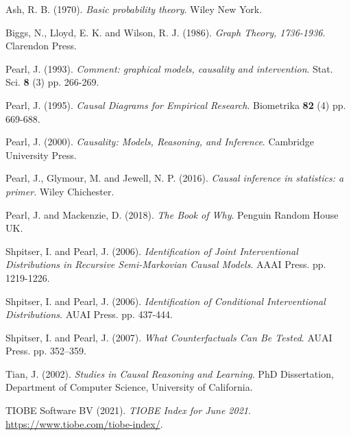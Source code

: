


\begin{thebibliography}{TIOBE 2021}%


 {\sc Ash, R. B.} (1970). {\em Basic probability theory}. Wiley New York.

 {\sc Biggs, N., Lloyd, E. K. and Wilson, R. J.} (1986). {\em Graph Theory, 1736-1936}. Clarendon Press.

 {\sc Pearl, J.} (1993). {\em Comment: graphical models, causality and intervention}. Stat. Sci. {\bf 8} (3) pp. 266-269.

 {\sc Pearl, J.} (1995). {\em Causal Diagrams for Empirical Research}. Biometrika {\bf 82} (4) pp. 669-688.

 {\sc Pearl, J.} (2000). {\em Causality: Models, Reasoning, and Inference}. Cambridge University Press.

 {\sc Pearl, J., Glymour, M. and Jewell, N. P.} (2016). {\em Causal inference in statistics: a primer}. Wiley Chichester.

 {\sc Pearl, J. and Mackenzie, D.} (2018). {\em The Book of Why}. Penguin Random House UK.

 {\sc Shpitser, I. and Pearl, J.} (2006). {\em Identification of Joint Interventional Distributions in Recursive Semi-Markovian Causal Models}. AAAI Press. pp. 1219-1226.

 {\sc Shpitser, I. and Pearl, J.} (2006). {\em Identification of Conditional Interventional Distributions}. AUAI Press. pp. 437-444.

 {\sc Shpitser, I. and Pearl, J.} (2007). {\em What Counterfactuals Can Be Tested}. AUAI Press. pp. 352–359.

 {\sc Tian, J.} (2002). {\em Studies in Causal Reasoning and Learning}. PhD Dissertation, Department of Computer Science, University of California.

 {\sc TIOBE Software BV} (2021). {\em TIOBE Index for June 2021}. \url{https://www.tiobe.com/tiobe-index/}.


\end{thebibliography}

